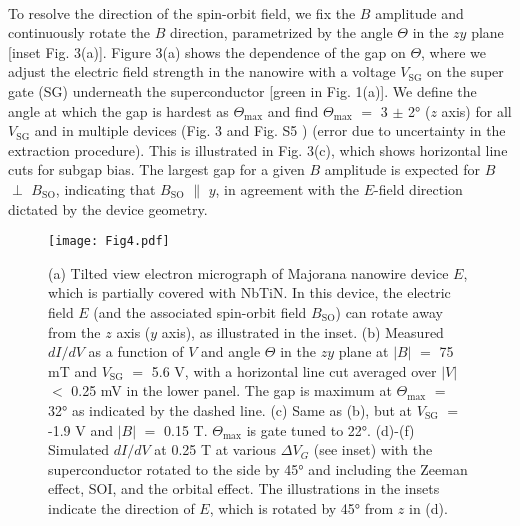 \\ \indent
To resolve the direction of the spin-orbit field, we fix the $B$ amplitude and continuously rotate the $B$ direction, parametrized by the angle $\Theta$ in the $zy$ plane [inset Fig. 3(a)]. Figure 3(a) shows the dependence of the gap on $\Theta$, where we adjust the electric field strength in the nanowire with a voltage $V_{\mathrm{SG}}$ on the super gate (SG) underneath the superconductor [green in Fig. 1(a)]. We define the angle at which the gap is hardest as $\Theta_{\mathrm{max}}$ and find $\Theta_{\mathrm{max}}$ $=$ 3 $\pm$ \ang{2} ($z$ axis) for all $V_{\mathrm{SG}}$ and in multiple devices (Fig. 3 and Fig. S5 \cite{Note1}) (error due to uncertainty in the extraction procedure). This is illustrated in Fig. 3(c), which shows horizontal line cuts for subgap bias. The largest gap for a given $B$ amplitude is expected for $B$ $\perp$ $B_{\mathrm{SO}}$, indicating that $B_{\mathrm{SO}}$ $\parallel$ $y$, in agreement with the $E$-field direction dictated by the device geometry.

\begin{figure}[b]
\texttt{[image: Fig4.pdf]}
\caption{\label{fig4}
    (a) Tilted view electron micrograph of Majorana nanowire device $E$, which is partially covered with NbTiN. In this device, the electric field $E$ (and the associated spin-orbit field $B_{\mathrm{SO}}$) can rotate away from the $z$ axis ($y$ axis), as illustrated in the inset. (b) Measured $dI/dV$ as a function of $V$ and angle $\Theta$ in the $zy$ plane at $|B|$ $=$ 75 mT and $V_{\mathrm{SG}}$ $=$ 5.6 V, with a horizontal line cut averaged over $|V|$ $<$ 0.25 mV in the lower panel. The gap is maximum at $\Theta_{\mathrm{max}}$ $=$ \ang{32} as indicated by the dashed line. (c) Same as (b), but at $V_{\mathrm{SG}}$ $=$ -1.9 V and $|B|$ $=$ 0.15 T. $\Theta_{\mathrm{max}}$ is gate tuned to \ang{22}. (d)-(f) Simulated $dI/dV$ at 0.25 T at various $\Delta V_G$ (see inset) with the superconductor rotated to the side by \ang{45} and including the Zeeman effect, SOI, and the orbital effect. The illustrations in the insets indicate the direction of $E$, which is rotated by \ang{45} from $z$ in (d).
}
\end{figure}

